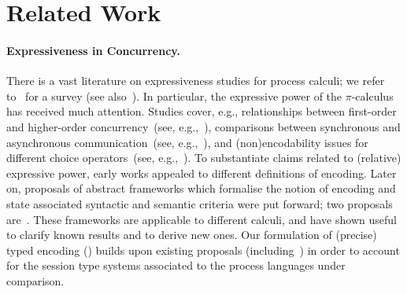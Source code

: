 \section{Related Work}
\label{sec:related}

\paragraph{Expressiveness in Concurrency.}
There is a vast literature on expressiveness studies for process calculi;
we refer to~\cite{DBLP:journals/entcs/Parrow08} for a survey
(see also~\cite[\S\,2.3]{PerezPhD10}). 
In particular, the expressive power of the $\pi$-calculus has received much attention.
Studies cover, e.g., 
relationships between first-order and higher-order concurrency~(see, e.g.,~\cite{San923,San96int}),
comparisons between 
synchronous and asynchronous communication~(see, e.g.,~\cite{Boudol92,Palamidessi03,BeauxisPV08}),
and
(non)encodability issues for different choice operators~(see, e.g.,~\cite{Nestmann00,DBLP:conf/esop/PetersNG13}).
To substantiate claims related to (relative) expressive power,
early works appealed to different definitions of encoding.
Later on, 
proposals of abstract 
frameworks which formalise the notion of encoding 
and state associated syntactic and semantic criteria 
were put forward; 
two proposals are~\cite{DBLP:journals/iandc/Gorla10,DBLP:journals/tcs/FuL10}. 
These frameworks are applicable to different calculi, and 
have shown useful to clarify known results and to derive new ones.
Our formulation of (precise) typed encoding () 
builds upon existing proposals (including~\cite{Palamidessi03,DBLP:journals/iandc/Gorla10,DBLP:conf/icalp/LanesePSS10})
in order to account for the session type systems
associated to the process languages under comparison.


